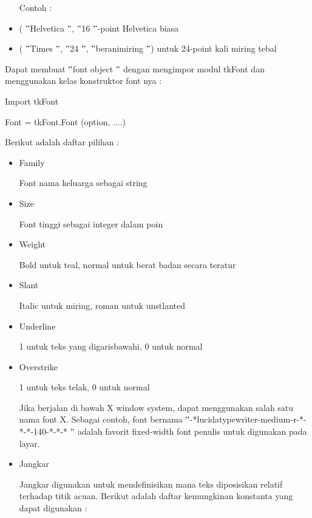 \documentclass[a4paper,12pt]{report}
\begin{document}
\begin{myEnumerate}
\begin{itemize}
\noindent 
Contoh : \par
\noindent 
\item ( $ " $Helvetica $ " $, $ " $16 $ " $-point Helvetica biasa \par
\noindent 
\item ( $ " $Times $ " $, $ " $24 $ " $, $ " $beranimiring $ " $) untuk 24-point kali miring tebal\end{itemize}
 \par
\vspace{12pt}
Dapat membuat  $ " $font object $ " $ dengan mengimpor modul tkFont dan menggunakan kelas konstruktor font nya : \par
Import tkFont \par
Font = tkFont.Font (option, ....) \par
\vspace{12pt}
Berikut adalah daftar pilihan : \par
\noindent 
\begin{itemize}
\item Family \par
Font nama keluarga sebagai string \par
\noindent 
\item Size \par
Font tinggi sebagai integer dalam poin \par
\noindent 
\item Weight \par
Bold untuk teal, normal untuk berat badan secara teratur \par
\noindent 
\item Slant \par
Italic untuk miring, roman untuk unstlanted \par
\noindent 
\item Underline \par
1 untuk teks yang digarisbawahi, 0 untuk normal \par
\noindent 
\item Overstrike \par
1 untuk teks telak, 0 untuk normal \par
Jika berjalan di bawah X window system, dapat menggunakan salah satu nama font X. Sebagai contoh, font bernama  $ " $-*lucidatypewriter-medium-r-*-*-*-140-*-*-* $ " $ adalah favorit fixed-width font penulis untuk digunakan pada layar. \par
\noindent 
\item Jangkar \par
\noindent 
Jangkar digunakan untuk mendefinisikan mana teks diposisikan relatif terhadap titik acuan. Berikut adalah daftar kemungkinan konstanta yang dapat digunakan : \par

\end{itemize}
\end{myEnumerate}
\end{document}
